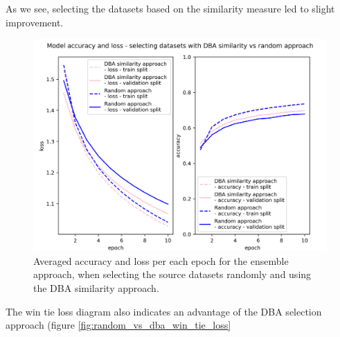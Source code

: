 \documentclass[a4paper,11pt,twoside]{report}
\theoremstyle{definition}
\begin{document}
As we see, selecting the datasets based on the similarity measure led to slight improvement.
\FloatBarrier
\begin{figure}[h!t]
\centering
\includegraphics[width=17cm]{imgs/dba_vs_random/loss_acc.png}
\caption{Averaged accuracy and loss per each epoch for the ensemble approach, when selecting the source datasets randomly and using the DBA similarity approach.}
\label{fig:random_vs_dba}
\end{figure}
\FloatBarrier
The win tie loss diagram also indicates an advantage of the DBA selection approach (figure \ref{fig:random_vs_dba_win_tie_loss}
\end{document}
